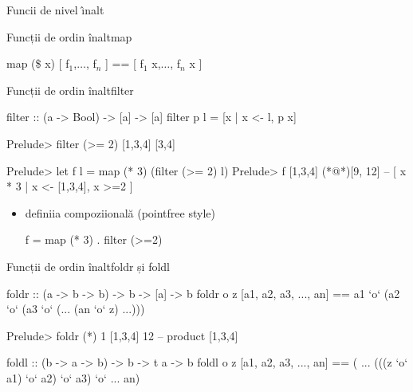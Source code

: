 \documentclass[xcolor=pdftex,romanian,colorlinks]{beamer}
\begin{document}
\begin{section}{Func\ts ii de nivel \^{\i}nalt}
\begin{frame}[fragile]{Funcții de ordin înalt}{map}
\begin{itemize}
map (\$ x) [ f$_1$,$\ldots$, f$_n$ ] == [ f$_1$ x,$\ldots$, f$_n$ x ]
\end{itemize}


\end{frame}


\begin{frame}[fragile]{Funcții de ordin înalt}{filter}
\begin{asciihs}

filter :: (a -> Bool) -> [a] -> [a]
filter p l = [x | x <- l, p x]

Prelude> filter (>= 2) [1,3,4]
[3,4]
\end{asciihs}
\pause


\begin{asciihs}
Prelude> let f l = map (* 3) (filter (>= 2) l)
Prelude> f [1,3,4]
(*@\pause@*)[9, 12]                   -- [ x * 3 | x <- [1,3,4], x >=2 ]
\end{asciihs}
\pause
\begin{itemize}
\item defini\ts ia compozi\ts ional\u a  (pointfree style)

\begin{asciihs}
f = map (* 3) . filter (>=2)
\end{asciihs}
\end{itemize}
\end{frame}

\begin{frame}[fragile]{Funcții de ordin înalt}{foldr și foldl}
\begin{block}{}
\begin{asciihs}
foldr :: (a -> b -> b) -> b -> [a] -> b
foldr o z [a1, a2, a3, ..., an] ==
    a1 `o` (a2 `o` (a3 `o` (... (an `o` z) ...)))
\end{asciihs}
\end{block}

\begin{asciihs}
Prelude> foldr (*) 1  [1,3,4]
12                  -- product [1,3,4]
\end{asciihs}

\pause

\begin{block}{}
\begin{asciihs}
foldl :: (b -> a -> b) -> b -> t a -> b
foldl o z [a1, a2, a3, ..., an] ==
    ( ... (((z `o` a1) `o` a2) `o` a3) `o` ... an)
\end{asciihs}
\end{block}


\end{frame}
\end{section}
\end{document}
